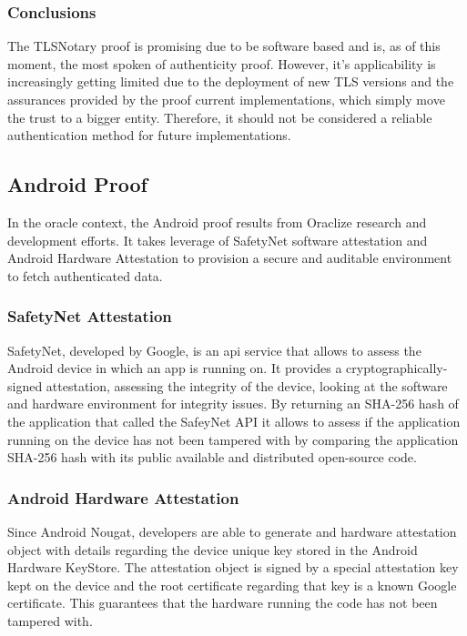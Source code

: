 \subsubsection{Conclusions}
The TLSNotary proof is promising due to be software based and is, as of this moment, the most spoken of authenticity proof. However, it's applicability is increasingly getting limited due to the deployment of new TLS versions and the assurances provided by the proof current implementations, which simply move the trust to a bigger entity. Therefore, it should not be considered a reliable authentication method for future implementations.

\subsection{Android Proof}
In the oracle context, the Android proof results from Oraclize research and development efforts. It takes leverage of SafetyNet software attestation and Android Hardware Attestation to provision a secure and auditable environment to fetch authenticated data. 

\subsubsection{SafetyNet Attestation}
SafetyNet, developed by Google, is an api service that allows to assess the Android device in which an app is running on. It provides a cryptographically-signed attestation, assessing the integrity of the device, looking at the software and hardware environment for integrity issues. By returning an SHA-256 hash of the application that called the SafeyNet API it allows to assess if the application running on the device has not been tampered with by comparing the application SHA-256 hash with its public available and distributed open-source code.

\subsubsection{Android Hardware Attestation}
Since Android Nougat, developers are able to generate and hardware attestation object with details regarding the device unique key stored in the Android Hardware KeyStore. The attestation object is signed by a special attestation key kept on the device and the root certificate regarding that key is a known Google certificate. This guarantees that the hardware running the code has not been tampered with.

